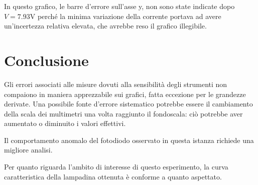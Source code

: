 \documentclass[a4paper]{article}
\begin{document}

In questo grafico, le barre d'errore sull'asse y, non sono state indicate dopo $V = 7.93$V perché la minima variazione della corrente portava ad avere un'incertezza relativa elevata, che avrebbe reso il grafico illegibile. 

\section{Conclusione}
Gli errori associati alle misure dovuti alla sensibilità degli strumenti non compaiono in maniera apprezzabile sui grafici, fatta eccezione per le grandezze derivate. Una possibile fonte d'errore sistematico potrebbe essere il cambiamento della scala dei multimetri una volta raggiunto il fondoscala: ciò potrebbe aver aumentato o diminuito i valori effettivi. 

Il comportamento anomalo del fotodiodo osservato in questa istanza richiede una migliore analisi. 

Per quanto riguarda l'ambito di interesse di questo esperimento, la curva caratteristica della lampadina ottenuta è conforme a quanto aspettato.
\end{document}
